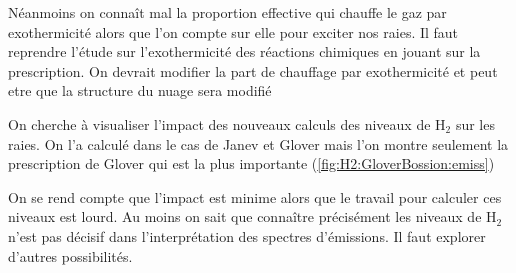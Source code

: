 Néanmoins on connaît mal la proportion effective qui chauffe le gaz par exothermicité alors que l'on compte sur elle pour exciter nos raies. Il faut reprendre l'étude sur l'exothermicité des réactions chimiques en jouant sur la prescription. On devrait modifier la part de chauffage par exothermicité et peut etre que la structure du nuage sera modifié \newline 

On cherche à visualiser l'impact des nouveaux calculs des niveaux de $\mathrm{H}_2$ sur les raies. On l'a calculé dans le cas de Janev et Glover mais l'on montre seulement la prescription de Glover qui est la plus importante (\autoref{fig:H2:GloverBossion:emiss})

On se rend compte que l'impact est minime alors que le travail pour calculer ces niveaux est lourd. Au moins on sait que connaître précisément les niveaux de $\mathrm{H}_2$ n'est pas décisif dans l'interprétation des spectres d'émissions. Il faut explorer d'autres possibilités. 

